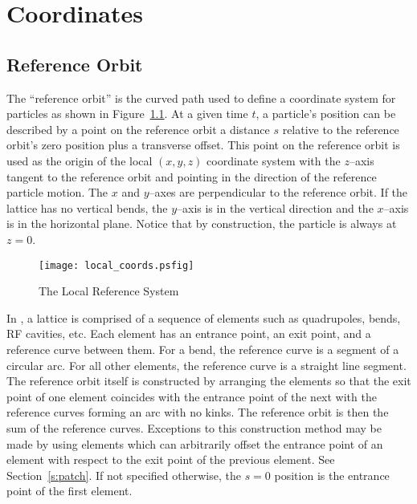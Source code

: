 \chapter{Coordinates}

\section{Reference Orbit}
\label{s:ref}

The ``reference orbit'' is the curved path used to define a coordinate
system for particles as shown in Figure~\ref{f:local_coords}.  At a
given time $t$, a particle's position can be described by a point on
the reference orbit a distance $s$ relative to the reference orbit's
zero position plus a transverse offset. This point on the reference
orbit is used as the origin of the local $(x, y, z)$ coordinate system
with the $z$--axis tangent to the reference orbit and pointing in the
direction of the reference particle motion. The $x$ and $y$--axes are
perpendicular to the reference orbit. If the lattice has no vertical
bends, the $y$--axis is in the vertical direction and the $x$--axis is
in the horizontal plane. Notice that by construction, the particle is
always at $z = 0$.

\begin{figure}[tb]
\centering
\texttt{[image: local\_coords.psfig]}
\caption{The Local Reference System}
\label{f:local_coords}
\end{figure}

In \bmad, a lattice is comprised of a sequence of elements such as
quadrupoles, bends, RF cavities, etc. Each element has an entrance
point, an exit point, and a reference curve between them. For a bend,
the reference curve is a segment of a circular arc. For all other
elements, the reference curve is a straight line segment.  The
reference orbit itself is constructed by arranging the elements so
that the exit point of one element coincides with the entrance point
of the next with the reference curves forming an arc with no kinks.
The reference orbit is then the sum of the reference
curves. Exceptions to this construction method may be made by using
 elements which can arbitrarily offset the entrance point
of an element with respect to the exit point of the previous element.
See Section~\ref{s:patch}.  If not specified otherwise, the $s = 0$
position is the entrance point of the first element.


